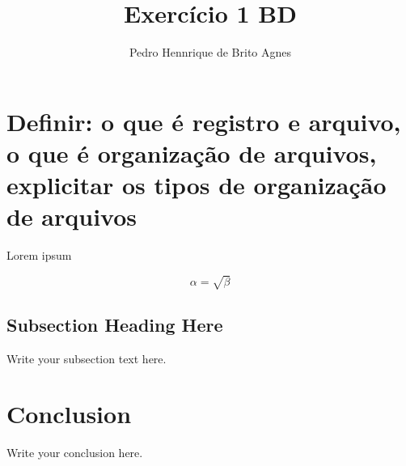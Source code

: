 \documentclass{article}
\begin{document}
\title{Exercício 1 BD}
\author{Pedro Hennrique de Brito Agnes}

\maketitle

\section{Definir: o que é registro e arquivo, o que é organização de arquivos, explicitar os tipos de organização de arquivos}
Lorem ipsum

\begin{equation}
    \label{simple_equation}
    \alpha = \sqrt{ \beta }
\end{equation}

\subsection{Subsection Heading Here}
Write your subsection text here.

\section{Conclusion}
Write your conclusion here.
\end{document}
